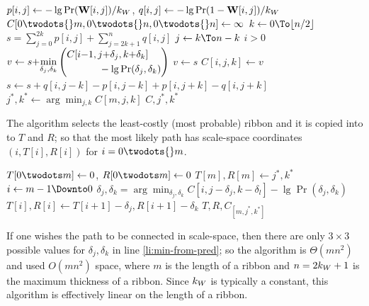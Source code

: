 \begin{codebox}
 \label{alg:segmet-ribbin}
\li $p[i,j]\gets -\lg \Pr(\mathbf{W}{}[i,j])/k_W{}$, 
          \hspace{2ex} $q[i,j] \gets -\lg \Pr(1-\mathbf{W}{}[i,j])/k_W{}$
\li $C{[0\twodots{}m, 0\twodots{}n, 0\twodots{}n]} \gets \infty$
\li {} \Do                                                \label{li:loop-slices}
\li     \For $k \gets 0 \To \lfloor n/2 \rfloor $ \Do                          \label{li:loop-radius}
\li         $s = \displaystyle{\sum_{j=0}^{2k} p[i,j] +\sum_{j=2k+1}^n  q[i, j] }$
\li         \For $j \gets k \To n-k$ \Do  \label{li:loop-center}
\li              \If $i > 0$  \Do                                              \label{li:if-has-pred}
\li              $v \gets s {+}\displaystyle{\min_{\delta_j, \delta_k}\left(  
                              \begin{aligned}
                              C[i{-}1,j{+}\delta_j,k{+}\delta_k] \hspace{3ex}\\
                              \hfill{}-\lg \Pr(\delta_j, \delta_k)
                              \end{aligned}
                            \right)}$  
                               \label{li:min-from-pred}
\li              \Else $v\gets s$
                 \End
\li              $C{[i, j, k]} \gets v$                                       \label{li:dp-store}
\li              $s \gets s{+}q[i,j{-}k]{-}p[i, j{-}k]{+}p[i, j{+}k]{-}q[i,j{+}k]$ \label{li:update-s}
           \End
       \End
    \End
\li $j^*, k^* \gets \displaystyle{\arg\min_{j,k} C{[m, j, k]}}$
\li \Return $C, j^*, k^*$
\end{codebox}

The  algorithm selects the least-costly (most probable) ribbon and it is copied into to $T$ and $R$; so that the most likely path has scale-space coordinates $(i, T[i], R[i])$ for $i=0\twodots{}m$. 



\begin{codebox}
 \label{alg:backtrack-ribbon}
\li $T{[0{\twodots}m]} \gets 0$, \quad $R{[0{\twodots}m]} \gets 0$             
\li $T{[m]}, R{[m]} \gets j^*, k^*$ \label{li:backtrack-best-last}
\li \For $i \gets m-1 \Downto 0$ \Do
\li      $\delta_j, \delta_k = \displaystyle{\arg\min_{\delta_j,\delta_k}C{[i,j{-}\delta_j,k{-}\delta_l]}{-}\lg \Pr(\delta_j,\delta_k)}$
\li      $T{[i]}, R[i] \gets T{[i+1]}-\delta_j, R{[i+1]}-\delta_k$                                                 \label{li:backtack-choose-pred}
    \End
\li \Return $T, R, C_{[m, j^*, k^*]}$
\end{codebox}


If one wishes the path to be connected in scale-space, then there are only $3\times3$ possible values for $\delta_j, \delta_k$ in line \ref{li:min-from-pred}; so the algorithm is $\Theta(m n^2)$ and used $O(m n^2)$ space, where $m$ is the length of a ribbon and $n=2k_W+1$ is the maximum thickness of a ribbon. Since $k_W$ is typically a constant, this algorithm is effectively linear on the length of a ribbon.
